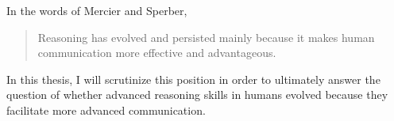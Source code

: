 In the words of Mercier and Sperber,
\begin{quote}
    Reasoning has evolved and persisted mainly because it makes human communication more effective and advantageous.
    \citep[p.~60]{MS11}
\end{quote}

In this thesis, I will scrutinize this position in order to ultimately
answer the question of whether advanced reasoning skills in humans evolved because they facilitate more advanced communication.

